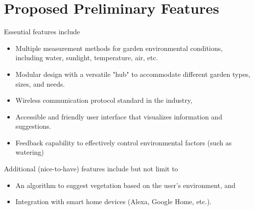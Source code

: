 \documentclass[]{article}
\begin{document}
\section*{Proposed Preliminary Features}
\noindent Essential features include
\begin{itemize}
	\item Multiple measurement methods for garden environmental conditions, including water, sunlight, temperature, air, etc.
	\item Modular design with a versatile "hub" to accommodate different garden types, sizes, and needs. 
	\item Wireless communication protocol standard in the industry,
	\item Accessible and friendly user interface that visualizes information and suggestions.
	\item Feedback capability to effectively control environmental factors (such as watering)
\end{itemize}
Additional (nice-to-have) features include but not limit to
\begin{itemize}
	\item An algorithm to suggest vegetation based on the user's environment, and
	\item Integration with smart home devices (Alexa, Google Home, etc.).
\end{itemize}
	

%
\vspace*{\fill}
 

\end{document}
